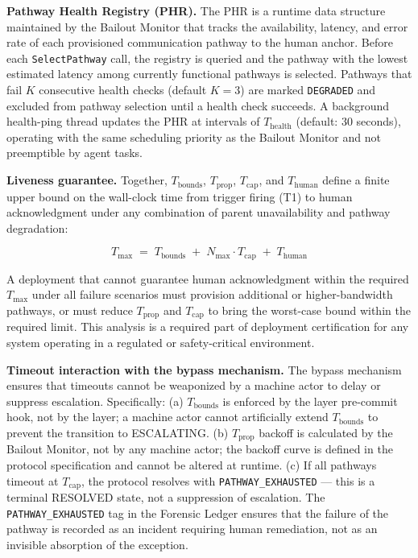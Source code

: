 \bigskip
\noindent\textbf{Pathway Health Registry (PHR).} The PHR is a runtime data structure maintained by the Bailout Monitor that tracks the availability, latency, and error rate of each provisioned communication pathway to the human anchor. Before each \texttt{SelectPathway} call, the registry is queried and the pathway with the lowest estimated latency among currently functional pathways is selected. Pathways that fail $K$ consecutive health checks (default $K = 3$) are marked \texttt{DEGRADED} and excluded from pathway selection until a health check succeeds. A background health-ping thread updates the PHR at intervals of $T_{\text{health}}$ (default: 30 seconds), operating with the same scheduling priority as the Bailout Monitor and not preemptible by agent tasks.

\bigskip
\noindent\textbf{Liveness guarantee.} Together, $T_{\text{bounds}}$, $T_{\text{prop}}$, $T_{\text{cap}}$, and $T_{\text{human}}$ define a finite upper bound on the wall-clock time from trigger firing (T1) to human acknowledgment under any combination of parent unavailability and pathway degradation:

\begin{equation}
T_{\max} \;=\; T_{\text{bounds}} \;+\; N_{\max} \cdot T_{\text{cap}} \;+\; T_{\text{human}} \tag{T-max}
\end{equation}

A deployment that cannot guarantee human acknowledgment within the required $T_{\max}$ under all failure scenarios must provision additional or higher-bandwidth pathways, or must reduce $T_{\text{prop}}$ and $T_{\text{cap}}$ to bring the worst-case bound within the required limit. This analysis is a required part of deployment certification for any \bxthree{} system operating in a regulated or safety-critical environment.

\bigskip
\noindent\textbf{Timeout interaction with the bypass mechanism.} The bypass mechanism ensures that timeouts cannot be weaponized by a machine actor to delay or suppress escalation. Specifically: (a) $T_{\text{bounds}}$ is enforced by the \fact{} layer pre-commit hook, not by the \bounds{} layer; a machine actor cannot artificially extend $T_{\text{bounds}}$ to prevent the transition to ESCALATING. (b) $T_{\text{prop}}$ backoff is calculated by the Bailout Monitor, not by any machine actor; the backoff curve is defined in the protocol specification and cannot be altered at runtime. (c) If all pathways timeout at $T_{\text{cap}}$, the protocol resolves with \texttt{PATHWAY\_EXHAUSTED} — this is a terminal RESOLVED state, not a suppression of escalation. The \texttt{PATHWAY\_EXHAUSTED} tag in the Forensic Ledger ensures that the failure of the pathway is recorded as an incident requiring human remediation, not as an invisible absorption of the exception.
